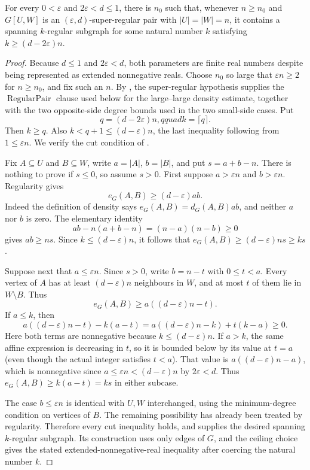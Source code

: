 \begin{lemma}
For every $0<\varepsilon$ and $2\varepsilon<d\leq1$, there is $n_0$ such
that, whenever $n\geq n_0$ and $G[U,W]$ is an
$(\varepsilon,d)$-super-regular pair with $|U|=|W|=n$, it contains a
spanning $k$-regular subgraph for some natural number $k$ satisfying
$k\geq(d-2\varepsilon)n$.
\end{lemma}
\begin{proof}
Because $d\leq1$ and $2\varepsilon<d$, both parameters are finite real
numbers despite being represented as extended nonnegative reals.  Choose
$n_0$ so large that $\varepsilon n\geq2$ for $n\geq n_0$, and fix such an
$n$.  By , the super-regular hypothesis supplies
the $\operatorname{RegularPair}$ clause used below for the large--large
density estimate, together with the two opposite-side degree bounds used in
the two small-side cases.  Put
\[
 q=(d-2\varepsilon)n,qquad k=\lceil q\rceil.
\]
Then $k\geq q$.  Also $k<q+1\leq(d-\varepsilon)n$, the last inequality
following from $1\leq\varepsilon n$.  We verify the cut condition of
.

Fix $A\subseteq U$ and $B\subseteq W$, write $a=|A|$, $b=|B|$, and put
$s=a+b-n$.  There is nothing to prove if $s\leq0$, so assume $s>0$.
First suppose $a>\varepsilon n$ and $b>\varepsilon n$.  Regularity gives
\[
 e_G(A,B)\geq(d-\varepsilon)ab.
\]
Indeed the definition of density says
$e_G(A,B)=d_G(A,B)ab$, and neither $a$ nor $b$ is zero.  The elementary
identity
\[
 ab-n(a+b-n)=(n-a)(n-b)\geq0
\]
gives $ab\geq ns$.  Since $k\leq(d-\varepsilon)n$, it follows that
$e_G(A,B)\geq(d-\varepsilon)ns\geq ks$.

Suppose next that $a\leq\varepsilon n$.  Since $s>0$, write $b=n-t$ with
$0\leq t<a$.  Every vertex of $A$ has at least $(d-\varepsilon)n$
neighbours in $W$, and at most $t$ of them lie in $W\setminus B$.  Thus
\[
 e_G(A,B)\geq a((d-\varepsilon)n-t).
\]
If $a\leq k$, then
\[
 a((d-\varepsilon)n-t)-k(a-t)
 =a((d-\varepsilon)n-k)+t(k-a)\geq0.
\]
Here both terms are nonnegative because $k\leq(d-\varepsilon)n$.  If
$a>k$, the same affine expression is decreasing in $t$, so it is bounded
below by its value at $t=a$ (even though the actual integer satisfies
$t<a$).  That value is $a((d-\varepsilon)n-a)$, which is nonnegative since
$a\leq\varepsilon n<(d-\varepsilon)n$ by $2\varepsilon<d$.
Thus $e_G(A,B)\geq k(a-t)=ks$ in either subcase.

The case $b\leq\varepsilon n$ is identical with $U,W$ interchanged, using
the minimum-degree condition on vertices of $B$.  The remaining possibility
has already been treated by regularity.  Therefore every cut inequality
holds, and  supplies the desired
spanning $k$-regular subgraph.  Its construction uses only edges of $G$, and
the ceiling choice gives the stated extended-nonnegative-real inequality
after coercing the natural number $k$.
\end{proof}
